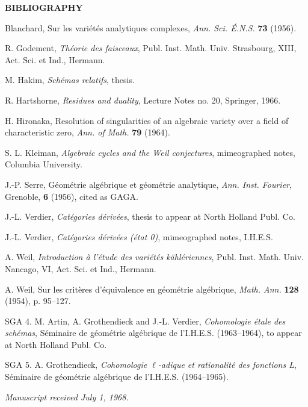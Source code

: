 \documentclass[10pt]{article}
\begin{document}
\begin{center}\bfseries BIBLIOGRAPHY\end{center}
\begin{enumerate}[label={\textup{[}\arabic*\textup{]}},leftmargin=2.8em]
\item Blanchard, Sur les variétés analytiques complexes, \emph{Ann. Sci. É.N.S.} \textbf{73} (1956).
\item R. Godement, \emph{Théorie des faisceaux}, Publ. Inst. Math. Univ. Strasbourg, XIII, Act. Sci. et Ind., Hermann.
\item M. Hakim, \emph{Schémas relatifs}, thesis.
\item R. Hartshorne, \emph{Residues and duality}, Lecture Notes no. 20, Springer, 1966.
\item H. Hironaka, Resolution of singularities of an algebraic variety over a field of characteristic zero, \emph{Ann. of Math.} \textbf{79} (1964).
\item S. L. Kleiman, \emph{Algebraic cycles and the Weil conjectures}, mimeographed notes, Columbia University.
\item J.-P. Serre, Géométrie algébrique et géométrie analytique, \emph{Ann. Inst. Fourier}, Grenoble, \textbf{6} (1956), cited as GAGA.
\item J.-L. Verdier, \emph{Catégories dérivées}, thesis to appear at North Holland Publ. Co.
\item J.-L. Verdier, \emph{Catégories dérivées (état 0)}, mimeographed notes, I.H.E.S.
\item A. Weil, \emph{Introduction à l'étude des variétés kählériennes}, Publ. Inst. Math. Univ. Nancago, VI, Act. Sci. et Ind., Hermann.
\item A. Weil, Sur les critères d'équivalence en géométrie algébrique, \emph{Math. Ann.} \textbf{128} (1954), p. 95--127.
\end{enumerate}
\noindent\textsc{SGA 4}. M. Artin, A. Grothendieck and J.-L. Verdier, \emph{Cohomologie étale des schémas}, Séminaire de géométrie algébrique de l'I.H.E.S. (1963--1964), to appear at North Holland Publ. Co.

\noindent\textsc{SGA 5}. A. Grothendieck, \emph{Cohomologie $\ell$-adique et rationalité des fonctions L}, Séminaire de géométrie algébrique de l'I.H.E.S. (1964--1965).

\begin{center}\emph{Manuscript received July 1, 1968.}\end{center}
\end{document}
